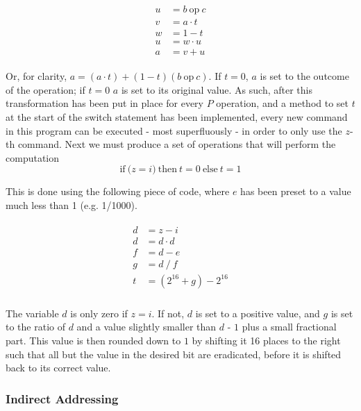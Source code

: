 \documentclass[Master.tex]{subfiles}
\begin{document}
\begin{gather*}
\begin{aligned}
u &= b\ \mathrm{op}\ c \\
v &= a \cdot t \\
w &= 1 - t \\
u &= w \cdot u \\
a &= v + u
\end{aligned}
\end{gather*}

Or, for clarity, $a = (a \cdot t) + (1 - t)(b\ \mathrm{op}\ c)$. If $t = 0$, $a$ is set to the outcome of the operation; if $t = 0$ $a$ is set to its original value. As such, after this transformation has been put in place for every $P$ operation, and a method to set $t$ at the start of the switch statement has been implemented, every new command in this program can be executed - most superfluously - in order to only use the $z$-th command. Next we must produce a set of operations that will perform the computation
\begin{equation*}
\mathrm{if\ (}z = i\mathrm{)\ then\ } t = 0 \mathrm{\ else\ } t = 1
\end{equation*}

This is done using the following piece of code, where $e$ has been preset to a value much less than 1 (e.g. 1/1000).

\begin{gather*}
\begin{aligned}
d &= z - i \\
d &= d \cdot d \\
f &= d - e \\
g &= d\ /\ f \\[1ex]
t &= (2^{16} + g) - 2^{16} \\
\end{aligned}
\end{gather*}

The variable $d$ is only zero if $z = i$. If not, $d$ is set to a positive value, and $g$ is set to the ratio of $d$ and a value slightly smaller than $d$ - $1$ plus a small fractional part. This value is then rounded down to $1$ by shifting it 16 places to the right such that all but the value in the desired bit are eradicated, before it is shifted back to its correct value.

\subsubsection{Indirect Addressing}
\end{document}
